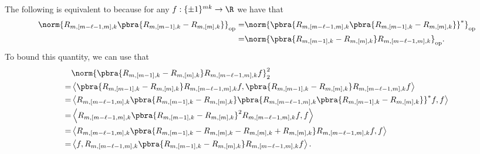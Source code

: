 The following is equivalent to  because for any $f:\{\pm1\}^{mk}\to \R$ we have that
\begin{align*}
    \norm{R_{m,[m-\ell-1,m],k}\pbra{R_{m,[m-1],k}-R_{m,[m],k}}}_{\mathrm{op}}=&
    \norm{\pbra{R_{m,[m-\ell-1,m],k}\pbra{R_{m,[m-1],k}-R_{m,[m],k}}}^*}_{\mathrm{op}}\\
    =&\norm{\pbra{R_{m,[m-1],k}-R_{m,[m],k}}R_{m,[m-\ell-1,m],k}}_{\mathrm{op}}.
\end{align*}
To bound this quantity, we can use that
\begin{align*}
    &\norm{\pbra{R_{m,[m-1],k}-R_{m,[m],k}}R_{m,[m-\ell-1,m],k}f}^2_2\\
    =&\left\langle \pbra{R_{m,[m-1],k}-R_{m,[m],k}}R_{m,[m-\ell-1,m],k}f,\pbra{R_{m,[m-1],k}-R_{m,[m],k}}R_{m,[m-\ell-1,m],k}f\right\rangle\\
    =&\left\langle R_{m,[m-\ell-1,m],k}\pbra{R_{m,[m-1],k}-R_{m,[m],k}}\pbra{R_{m,[m-\ell-1,m],k}\pbra{R_{m,[m-1],k}-R_{m,[m],k}}}^*f,f\right\rangle\\
    =&\left\langle R_{m,[m-\ell-1,m],k}\pbra{R_{m,[m-1],k}-R_{m,[m],k}}^2R_{m,[m-\ell-1,m],k}f,f\right\rangle\\
    =&\left\langle R_{m,[m-\ell-1,m],k}\pbra{R_{m,[m-1],k}-R_{m,[m],k}-R_{m,[m],k}+R_{m,[m],k}}R_{m,[m-\ell-1,m],k}f,f\right\rangle\\
    =&\left\langle f,R_{m,[m-\ell-1,m],k}\pbra{R_{m,[m-1],k}-R_{m,[m],k}}R_{m,[m-\ell-1,m],k}f\right\rangle.
\end{align*}


